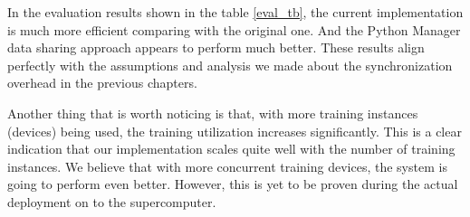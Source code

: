 \documentclass[conference]{IEEEtran}
\begin{document}
\begin{table}[!htb]
\centering
\caption{\small Performance Evaluation}
\label{eval_tb}
\end{table}

In the evaluation results shown in the table \ref{eval_tb}, the current implementation is much more efficient comparing with the original one. 
And the Python Manager data sharing approach appears to perform much better. 
These results align perfectly with the assumptions and analysis we made about the synchronization overhead in the previous chapters. 

Another thing that is worth noticing is that, with more training instances (devices) being used, the training utilization increases significantly. 
This is a clear indication that our implementation scales quite well with the number of training instances. 
We believe that with more concurrent training devices, the system is going to perform even better. 
However, this is yet to be proven during the actual deployment on to the supercomputer. 
\end{document}
